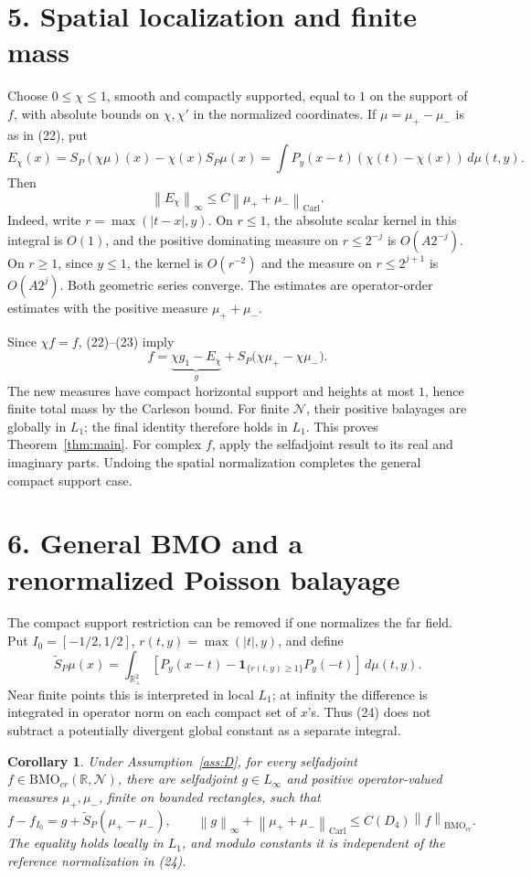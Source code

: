 \documentclass[11pt]{article}
\newtheorem{corollary}[theorem]{Corollary}
\newcommand{\N}{\mathcal N}
\newcommand{\BMO}{\mathrm{BMO}}
\newcommand{\Carl}{\mathrm{Carl}}
\newcommand{\R}{\mathbb R}
\newcommand{\norm}[1]{\left\|#1\right\|}
\begin{document}
\section*{5. Spatial localization and finite mass}
Choose \(0\le\chi\le1\), smooth and compactly supported, equal to \(1\)
on the support of \(f\), with absolute bounds on \(\chi,\chi'\)
in the normalized coordinates. If \(\mu=\mu_+-\mu_-\) is as in (22), put
\[
 E_\chi(x)
 =S_P(\chi\mu)(x)-\chi(x)S_P\mu(x)
 =\int P_y(x-t)(\chi(t)-\chi(x))\,d\mu(t,y).
\]
Then
\[
 \norm{E_\chi}_\infty\le C\norm{\mu_++\mu_-}_{\Carl}.       \tag{23}
\]
Indeed, write \(r=\max(|t-x|,y)\).
On \(r\le1\), the absolute scalar kernel in this integral is \(O(1)\),
and the positive dominating measure on \(r\le2^{-j}\) is \(O(A2^{-j})\).
On \(r\ge1\), since \(y\le1\), the kernel is \(O(r^{-2})\) and the
measure on \(r\le2^{j+1}\) is \(O(A2^j)\).
Both geometric series converge. The estimates are operator-order
estimates with the positive measure \(\mu_++\mu_-\).

Since \(\chi f=f\), (22)--(23) imply
\[
 f=\underbrace{\chi g_1-E_\chi}_{g}
       +S_P\bigl(\chi\mu_+-\chi\mu_-\bigr).
\]
The new measures have compact horizontal support and heights at most
\(1\), hence finite total mass by the Carleson bound.
For finite \(\N\), their positive balayages are globally in \(L_1\);
the final identity therefore holds in \(L_1\).
This proves Theorem~\ref{thm:main}.
For complex \(f\), apply the selfadjoint result to its real and imaginary
parts. Undoing the spatial normalization completes the general compact
support case.

\section*{6. General BMO and a renormalized Poisson balayage}
The compact support restriction can be removed if one normalizes the
far field. Put \(I_0=[-1/2,1/2]\), \(r(t,y)=\max(|t|,y)\), and define
\[
 \widetilde S_P\mu(x)
 =\int_{\R^2_+}\left[
 P_y(x-t)-\mathbf1_{\{r(t,y)\ge1\}}P_y(-t)
 \right]\,d\mu(t,y).                         \tag{24}
\]
Near finite points this is interpreted in local \(L_1\); at infinity
the difference is integrated in operator norm on each compact set of
\(x\)'s. Thus (24) does not subtract a potentially divergent global
constant as a separate integral.

\begin{corollary}\label{cor:general}
Under Assumption~\ref{ass:D}, for every selfadjoint
\(f\in\BMO_{cr}(\R,\N)\), there are selfadjoint \(g\in L_\infty\)
and positive operator-valued measures \(\mu_+,\mu_-\), finite on bounded
rectangles, such that
\[
 f-f_{I_0}=g+\widetilde S_P(\mu_+-\mu_-),
 \qquad
 \norm{g}_\infty+\norm{\mu_++\mu_-}_{\Carl}
 \le C(D_4)\norm{f}_{\BMO_{cr}}.                 \tag{25}
\]
The equality holds locally in \(L_1\), and modulo constants it is
independent of the reference normalization in (24).
\end{corollary}
\end{document}
